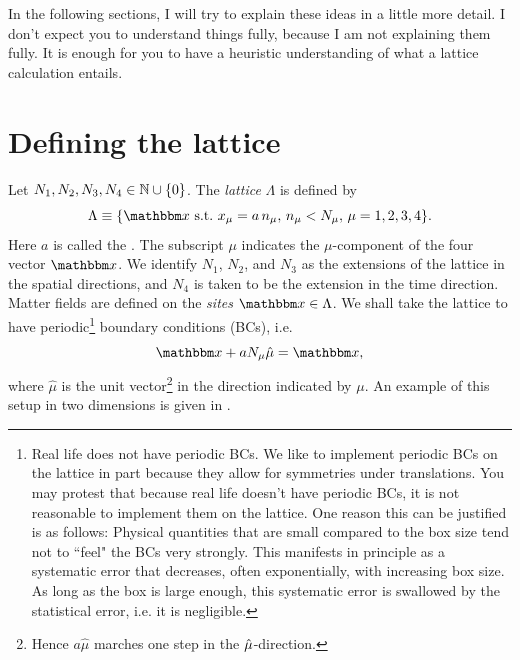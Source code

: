 In the following sections, I will try to explain these ideas in a little more
detail. I don't expect you to understand things fully, because I am not
explaining them fully. It is enough for you to have a heuristic understanding of
what a lattice calculation entails. 


\section{Defining the lattice}

Let $N_{1},N_{2},N_{3},N_{4}\in \mathbb{N}\cup\{0\}$. The {\it lattice} ${\Lambda}$ is defined by
\begin{equation}
  {\Lambda}\equiv\{\fvec{x}\suchthat x_\mu=a\,n_\mu,\,n_\mu< N_\mu,\,
      \mu=1,2,3,4\}.
\end{equation}
Here $a$ is called the .
The subscript $\mu$ indicates the $\mu$-component of the four vector $\fvec{x}$.
We identify $N_1$, $N_2$, and $N_3$
as the extensions of the lattice in the spatial directions,
and $N_4$ is taken to be the extension in the time
direction. Matter fields 
are defined on the  {\it sites} $\fvec{x}\in\Lambda$. We shall
take the lattice to have periodic\footnote{Real life does not have periodic BCs.
We like to implement periodic BCs on the lattice in part because they allow for
symmetries under translations. You may protest that because real life doesn't
have periodic BCs, it is not reasonable to implement them on the lattice. One
reason this can be justified is as follows: Physical quantities that are small
compared to the box size tend not to ``feel" the BCs very strongly. This
manifests in principle as a systematic error that decreases, often
exponentially, with increasing box size. As long as the box is large enough, 
this systematic error is swallowed by
the statistical error, i.e. it is negligible.} boundary conditions (BCs), i.e.
\begin{equation}\label{eq:PBC}
  \fvec{x}+aN_{\mu}\hat{\mu}=\fvec{x},
\end{equation}
where $\hat{\mu}$ is the unit vector\footnote{Hence $a\hat{\mu}$ marches one 
step in the $\hat{\mu}$-direction.} in the direction indicated by $\mu$.
An example of this setup in two dimensions is given in .

